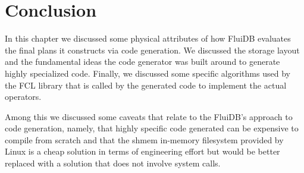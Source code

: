 \section{Conclusion}

In this chapter we discussed some physical attributes of how FluiDB
evaluates the final plans it constructs via code generation. We
discussed the storage layout and the fundamental ideas the code
generator was built around to generate highly specialized
code. Finally, we discussed some specific algorithms used by the FCL
library that is called by the generated code to implement the actual
operators.

Among this we discussed some caveats that relate to the FluiDB's
approach to code generation, namely, that highly specific code
generated can be expensive to compile from scratch and that the shmem
in-memory filesystem provided by Linux is a cheap solution in terms of
engineering effort but would be better replaced with a solution that
does not involve system calls.
